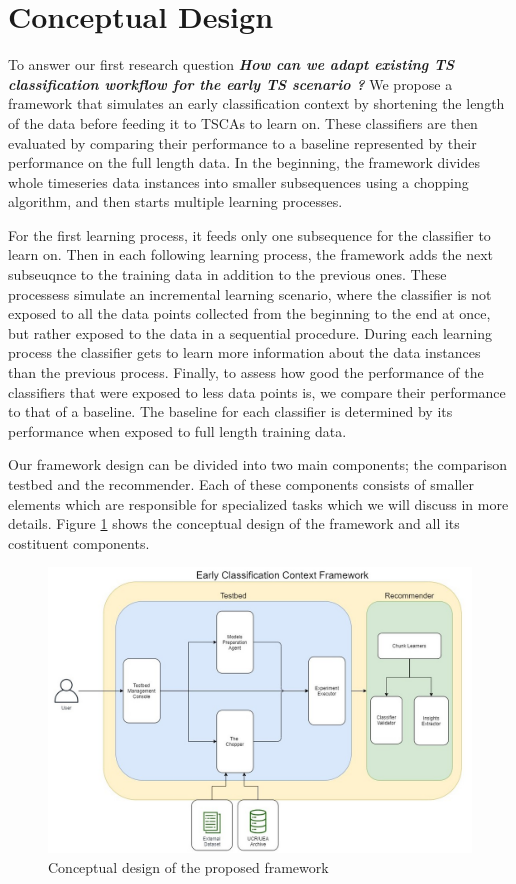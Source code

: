\section{Conceptual Design}
\label{SectionConceptualDesign}
To answer our first research question \textbf{\textit{How can we adapt existing TS classification workflow for the early TS scenario ?}}
We propose a framework that simulates an early classification context by shortening the length of the data before feeding it to TSCAs to learn on.
These classifiers are then evaluated by comparing their performance to a baseline represented by their performance on the full length data.
In the beginning, the framework divides whole timeseries data instances into smaller subsequences using a chopping algorithm, and then starts multiple learning processes.

For the first learning process, it feeds only one subsequence for the classifier to learn on.
Then in each following learning process, the framework adds the next subseuqnce to the training data in addition to the previous ones.
These processess simulate an incremental learning scenario, where the classifier is not exposed to all the data points collected from the beginning to the end at once, but rather exposed to the data in a sequential procedure.
During each learning process the classifier gets to learn more information about the data instances than the previous process.
Finally, to assess how good the performance of the classifiers that were exposed to less data points is, we compare their performance to that of a baseline.
The baseline for each classifier is determined by its performance when exposed to full length training data.

Our framework design can be divided into two main components; the comparison testbed and the recommender.
Each of these components consists of smaller elements which are responsible for specialized tasks which we will discuss in more details.
Figure \ref{Img:ConceptualDesign} shows the conceptual design of the framework and all its costituent components.

\begin{figure}[!htbp]
  \captionsetup{justification=raggedright}
  \centering
  \includegraphics[width=\textwidth]{Framework Diagram.jpg}
  \centering
  \caption{Conceptual design of the proposed framework}
  \label{Img:ConceptualDesign}
\end{figure}

